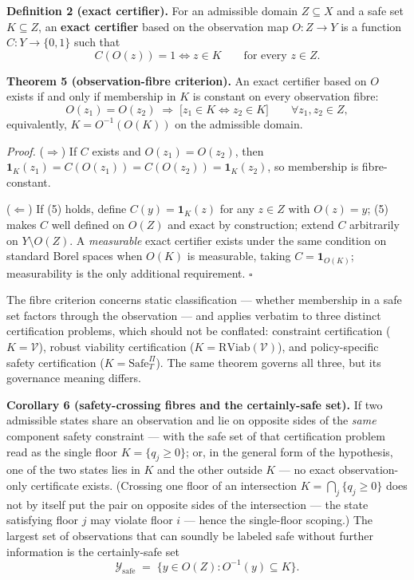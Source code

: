 \documentclass[11pt]{article}
\begin{document}
\textbf{Definition 2 (exact certifier).} For an admissible domain
\(Z \subseteq X\) and a safe set \(K \subseteq Z\), an \textbf{exact
certifier} based on the observation map \(O : Z \to Y\) is a function
\(C : Y \to \{0,1\}\) such that
\[C(O(z)) = 1 \iff z \in K \qquad \text{for every } z \in Z.\]

\textbf{Theorem 5 (observation-fibre criterion).} An exact certifier
based on \(O\) exists if and only if membership in \(K\) is constant on
every observation fibre:
\[O(z_1) = O(z_2) \;\Longrightarrow\; \big[ z_1 \in K \iff z_2 \in K \big] \qquad \forall z_1, z_2 \in Z, \tag{5}\]
equivalently, \(K = O^{-1}(O(K))\) on the admissible domain.

\emph{Proof.} (\(\Rightarrow\)) If \(C\) exists and \(O(z_1) = O(z_2)\),
then \(\mathbf{1}_K(z_1) = C(O(z_1)) = C(O(z_2)) = \mathbf{1}_K(z_2)\),
so membership is fibre-constant.

(\(\Leftarrow\)) If (5) holds, define \(C(y) = \mathbf{1}_K(z)\) for any
\(z \in Z\) with \(O(z) = y\); (5) makes \(C\) well defined on \(O(Z)\)
and exact by construction; extend \(C\) arbitrarily on
\(Y \setminus O(Z)\). A \emph{measurable} exact certifier exists under
the same condition on standard Borel spaces when \(O(K)\) is measurable,
taking \(C = \mathbf{1}_{O(K)}\); measurability is the only additional requirement. \ensuremath{\square}

The fibre criterion concerns static classification --- whether
membership in a safe set factors through the observation --- and applies
verbatim to three distinct certification problems, which should not be
conflated: constraint certification (\(K = \mathcal{V}\)), robust
viability certification (\(K = \mathrm{RViab}(\mathcal{V})\)), and
policy-specific safety certification (\(K = \mathrm{Safe}^{\Pi}_T\)).
The same theorem governs all three, but its governance meaning differs.

\textbf{Corollary 6 (safety-crossing fibres and the certainly-safe
set).} If two admissible states share an observation and lie on opposite
sides of the \emph{same} component safety constraint --- with the safe
set of that certification problem read as the single floor
\(K = \{ q_j \ge 0 \}\); or, in the general form of the hypothesis, one
of the two states lies in \(K\) and the other outside \(K\) --- no exact
observation-only certificate exists. (Crossing one floor of an
intersection \(K = \bigcap_j \{ q_j \ge 0 \}\) does not by itself put
the pair on opposite sides of the intersection --- the state satisfying
floor \(j\) may violate floor \(i\) --- hence the single-floor scoping.)
The largest set of observations that can soundly be labeled safe without
further information is the certainly-safe set
\[\mathcal{Y}_{\mathrm{safe}} \;=\; \big\{ y \in O(Z) : O^{-1}(y) \subseteq K \big\}.\]
\end{document}
